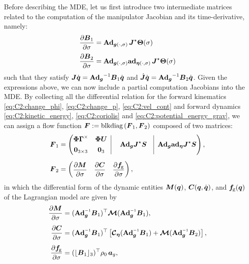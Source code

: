 Before describing the MDE, let us first introduce two intermediate matrices related to the computation of the manipulator Jacobian and its time-derivative, namely:
%
\begin{align}
\frac{\partial \boldsymbol{B}_1}{\partial \sigma} &= \textbf{Ad}_{{\boldsymbol{g}}(\cdot,\sigma)}\, \boldsymbol{J}^\star \boldsymbol{\Theta}(\sigma) \\[0.25em]
\frac{\partial \boldsymbol{B}_2}{\partial \sigma} &= \textbf{Ad}_{{\boldsymbol{g}}(\cdot,\sigma)}\textbf{ad}_{{\boldsymbol{\eta}}(\cdot,\sigma)}\, \boldsymbol{J}^\star {\boldsymbol{\Theta}}(\sigma)
\end{align}
%
such that they satisfy $\boldsymbol{J} {\dot{\boldsymbol{q}}} = {\textbf{Ad}_{\boldsymbol{g}}}^{-1} \boldsymbol{B}_1 {\dot{\boldsymbol{q}}}$ and $\,\dot{\!\boldsymbol{J}} {\dot{\boldsymbol{q}}} = {\textbf{Ad}_{\boldsymbol{g}}}^{-1} \boldsymbol{B}_2 {\dot{\boldsymbol{q}}}$.
Given the expressions above, we can now include a partial computation Jacobians into the MDE. By collecting all the differential relation for the forward kinematics \eqref{eq:C2:change_phi}, \eqref{eq:C2:change_p}, \eqref{eq:C2:vel_cont} and forward dynamics \eqref{eq:C2:kinetic_energy}, \eqref{eq:C2:coriolis} and
\eqref{eq:C2:potential_energy_grav}, we can assign a flow function
$\boldsymbol{F}:= \text{blkdiag}\left(\boldsymbol{F}_1,\boldsymbol{F}_2 \right)$
composed of two matrices:
%
\begin{align}
\mat{F}_1 & = \begin{pmatrix}
\begin{matrix} \PhiB \vec{\Gamma}^\times & \PhiB \vec{U} \\[0.35em] \vec{0}_{3\times3} & \vec{0}_3 \end{matrix}
\;\; \vrule\; & \Ad_{\gB} \JB^\star\mat{S} &\vrule\;\; \Ad_{\gB} \ad_{\etaB} \JB^\star \mat{S}
\end{pmatrix}, \\[0.5em]
\mat{F}_2 & = \begin{pmatrix}
\dfrac{\p \mat{M}}{\p \sigma} & \dfrac{\p \mat{C}}{\p \sigma} & \dfrac{\p \vec{f}\!\grav}{\p \sigma} \end{pmatrix},
\end{align}
in which the differential form of the dynamic entities $\boldsymbol{M}({\boldsymbol{q}})$, $\boldsymbol{C}({\boldsymbol{q}},{\dot{\boldsymbol{q}}})$, and $\boldsymbol{f}\!_{\scriptstyle\textrm{g}}({\boldsymbol{q}})$ of the Lagrangian model are given by
%
\begin{align}
\dfrac{\p \mat{M}}{\p \sigma} & = (\Ad_{\gB}\inv \mat{B}_1)^\top \ten{M} (\Ad_{\gB}\inv \mat{B}_1), \\[0.4em]
\dfrac{\p \mat{C}}{\p \sigma} & = (\Ad_{\gB}\inv \mat{B}_1)^\top \left[\ten{C}_\etaB (\Ad_{\gB}\inv \mat{B}_1) + \ten{M} (\Ad_{\gB}\inv \mat{B}_2) \right], \\[0.4em]
\dfrac{\p \vec{f}\!\grav}{\p \sigma} & = (\floor{\mat{B}_{1}}_3)^\top \rho_0\, \vec{a}_g,
\end{align}
